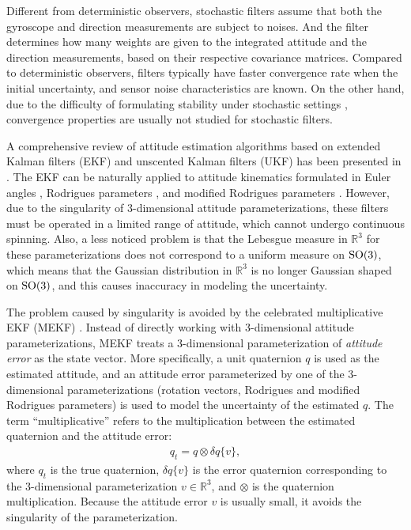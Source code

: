 Different from deterministic observers, stochastic filters assume that both the gyroscope and direction measurements are subject to noises.
And the filter determines how many weights are given to the integrated attitude and the direction measurements, based on their respective covariance matrices.
Compared to deterministic observers, filters typically have faster convergence rate when the initial uncertainty, and sensor noise characteristics are known.
On the other hand, due to the difficulty of formulating stability under stochastic settings \cite{karvonen2020stability}, convergence properties are usually not studied for stochastic filters.

A comprehensive review of attitude estimation algorithms based on extended Kalman filters (EKF) and unscented Kalman filters (UKF) has been presented in \cite{crassidis2007survey}.
The EKF can be naturally applied to attitude kinematics formulated in Euler angles \cite{farrell1970attitude,foxlin1996inertial}, Rodrigues parameters \cite{idan1996estimation}, and modified Rodrigues parameters \cite{crassidis1996attitude}.
However, due to the singularity of 3-dimensional attitude parameterizations, these filters must be operated in a limited range of attitude, which cannot undergo continuous spinning.
Also, a less noticed problem is that the Lebesgue measure in $\mathbb{R}^3$ for these parameterizations does not correspond to a uniform measure on $\mathrm{SO}(3)$, which means that the Gaussian distribution in $\mathbb{R}^3$ is no longer Gaussian shaped on $\mathrm{SO}(3)$, and this causes inaccuracy in modeling the uncertainty.

The problem caused by singularity is avoided by the celebrated multiplicative EKF (MEKF) \cite{lefferts1982kalman,markley2003attitude}.
Instead of directly working with 3-dimensional attitude parameterizations, MEKF treats a 3-dimensional parameterization of \textit{attitude error} as the state vector.
More specifically, a unit quaternion $q$ is used as the estimated attitude, and an attitude error parameterized by one of the 3-dimensional parameterizations (rotation vectors, Rodrigues and modified Rodrigues parameters) is used to model the uncertainty of the estimated $q$.
The term ``multiplicative'' refers to the multiplication between the estimated quaternion and the attitude error:
\begin{align} \label{eqn:attitude error representation}
	q_t = q \otimes \delta q\{v\},
\end{align}
where $q_t$ is the true quaternion, $\delta q\{v\}$ is the error quaternion corresponding to the 3-dimensional parameterization $v\in\mathbb{R}^3$, and $\otimes$ is the quaternion multiplication.
Because the attitude error $v$ is usually small, it avoids the singularity of the parameterization.

